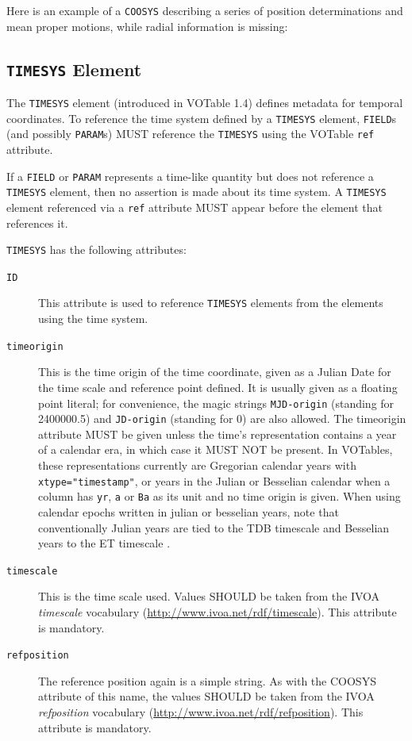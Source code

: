 \documentclass[11pt,a4paper]{ivoa}
\let\fg=\color
\def\attr#1{{\tt{\fg{DarkRed}#1}}}
\def\elem#1{{\tt{\fg{DarkRed}#1}}}
\def\attrval#1#2{{\tt{\fg{DarkRed}#1}="{\fg{DarkPurple}#2}"}}
\begin{document}
Here is an example of a \elem{COOSYS} describing a series of position
determinations and mean proper motions, while radial information is
missing:

\begingroup\small

\endgroup


\subsection{\elem{TIMESYS} Element}
\label{elem:TIMESYS}

The \elem{TIMESYS} element (introduced in VOTable 1.4) defines metadata
for temporal coordinates.  To reference the time system defined by a
\elem{TIMESYS} element,  \elem{FIELD}s (and possibly \elem{PARAM}s)
MUST reference the \elem{TIMESYS} using the VOTable \attr{ref} attribute.

If a \elem{FIELD} or \elem{PARAM} represents a time-like quantity but does not
reference a \elem{TIMESYS} element, then no assertion is made about its time
system. A \elem{TIMESYS} element referenced via a \attr{ref} attribute MUST appear
before the element that references it.

\elem{TIMESYS} has the following attributes:

\begin{description}
\item[\attr{ID}] This attribute is used to reference \elem{TIMESYS}
elements from the elements using the time system.
\item[\attr{timeorigin}] This is the time origin of the time coordinate,
given as a Julian Date for the  time scale and reference point
defined.  It is usually given as a floating point
literal; for convenience, the magic strings \verb|MJD-origin| (standing
for 2400000.5) and \verb|JD-origin| (standing for 0) are also allowed.
The timeorigin attribute MUST be given unless the time's representation
contains a year of a calendar era, in which case it MUST NOT be present.
In VOTables, these
representations currently are Gregorian calendar years with
\attrval{xtype}{timestamp}, or years in the Julian or Besselian calendar when a column
has \verb|yr|, \verb|a| or \verb|Ba| as its unit and no time origin is
given.
When using calendar epochs written in julian or besselian years, note that
conventionally Julian years are tied to the TDB timescale and Besselian years to
the ET timescale \citep{2015A&A...574A..36R}.

\item[\attr{timescale}]  This is the time scale used.  Values SHOULD be
taken from the IVOA \emph{timescale}
vocabulary
(\url{http://www.ivoa.net/rdf/timescale}).
This attribute is mandatory.
\item[\attr{refposition}] The reference position again is a simple string.
As with the COOSYS attribute of this name, the values SHOULD be
taken from the IVOA \emph{refposition} vocabulary
(\url{http://www.ivoa.net/rdf/refposition}).
This attribute is mandatory.
\end{description}
\end{document}
